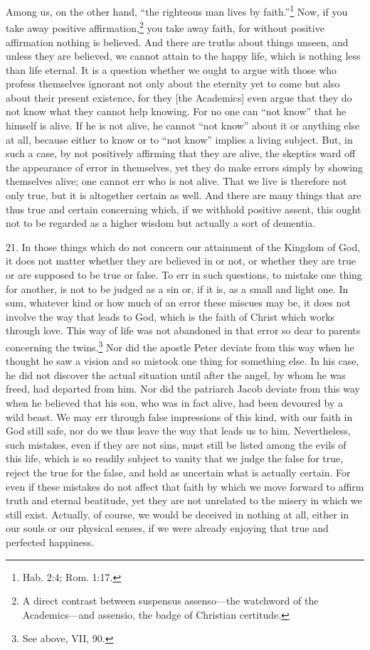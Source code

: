 Among us, on the other hand, ``the righteous man lives by faith.''\footnote{Hab. 2:4; Rom. 1:17.} Now, if you take away positive affirmation,\footnote{A direct contrast between suspensus assenso—the watchword of the Academics—and assensio, the badge of Christian certitude.} you take away faith, for without positive affirmation nothing is believed. And there are truths about things unseen, and unless they are believed, we cannot attain to the happy life, which is nothing less than life eternal. It is a question whether we ought to argue with those who profess themselves ignorant not only about the eternity yet to come but also about their present existence, for they [the Academics] even argue that they do not know what they cannot help knowing. For no one can ``not know'' that he himself is alive. If he is not alive, he cannot ``not know'' about it or anything else at all, because either to know or to ``not know'' implies a living subject. But, in such a case, by not positively affirming that they are alive, the skeptics ward off the appearance of error in themselves, yet they do make errors simply by showing themselves alive; one cannot err who is not alive. That we live is therefore not only true, but it is altogether certain as well. And there are many things that are thus true and certain concerning which, if we withhold positive assent, this ought not to be regarded as a higher wisdom but actually a sort of dementia.

21. In those things which do not concern our attainment of the Kingdom of God, it does not matter whether they are believed in or not, or whether they are true or are supposed to be true or false. To err in such questions, to mistake one thing for another, is not to be judged as a sin or, if it is, as a small and light one. In sum, whatever kind or how much of an error these miscues may be, it does not involve the way that leads to God, which is the faith of Christ which works through love. This way of life was not abandoned in that error so dear to parents concerning the twins.\footnote{See above, VII, 90.} Nor did the apostle Peter deviate from this way when he thought he saw a vision and so mistook one thing for something else. In his case, he did not discover the actual situation until after the angel, by whom he was freed, had departed from him. Nor did the patriarch Jacob deviate from this way when he believed that his son, who was in fact alive, had been devoured by a wild beast. We may err through false impressions of this kind, with our faith in God still safe, nor do we thus leave the way that leads us to him. Nevertheless, such mistakes, even if they are not sins, must still be listed among the evils of this life, which is so readily subject to vanity that we judge the false for true, reject the true for the false, and hold as uncertain what is actually certain. For even if these mistakes do not affect that faith by which we move forward to affirm truth and eternal beatitude, yet they are not unrelated to the misery in which we still exist. Actually, of course, we would be deceived in nothing at all, either in our souls or our physical senses, if we were already enjoying that true and perfected happiness.

